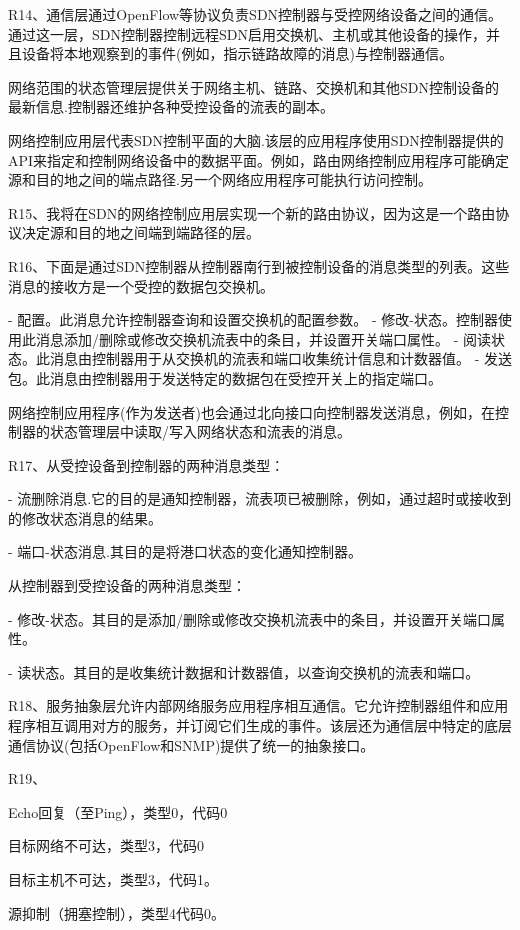 \documentclass[11pt,UTF8,twoside]{article}
\begin{document}
	R14、通信层通过OpenFlow等协议负责SDN控制器与受控网络设备之间的通信。通过这一层，SDN控制器控制远程SDN启用交换机、主机或其他设备的操作，并且设备将本地观察到的事件(例如，指示链路故障的消息)与控制器通信。
	
	网络范围的状态管理层提供关于网络主机、链路、交换机和其他SDN控制设备的最新信息.控制器还维护各种受控设备的流表的副本。
	
	网络控制应用层代表SDN控制平面的大脑.该层的应用程序使用SDN控制器提供的API来指定和控制网络设备中的数据平面。例如，路由网络控制应用程序可能确定源和目的地之间的端点路径.另一个网络应用程序可能执行访问控制。
	
	R15、我将在SDN的网络控制应用层实现一个新的路由协议，因为这是一个路由协议决定源和目的地之间端到端路径的层。
	
	R16、下面是通过SDN控制器从控制器南行到被控制设备的消息类型的列表。这些消息的接收方是一个受控的数据包交换机。
	
	- 配置。此消息允许控制器查询和设置交换机的配置参数。
	- 修改-状态。控制器使用此消息添加/删除或修改交换机流表中的条目，并设置开关端口属性。
	- 阅读状态。此消息由控制器用于从交换机的流表和端口收集统计信息和计数器值。
	- 发送包。此消息由控制器用于发送特定的数据包在受控开关上的指定端口。
	
	网络控制应用程序(作为发送者)也会通过北向接口向控制器发送消息，例如，在控制器的状态管理层中读取/写入网络状态和流表的消息。
	
	R17、从受控设备到控制器的两种消息类型：
	
	- 流删除消息.它的目的是通知控制器，流表项已被删除，例如，通过超时或接收到的修改状态消息的结果。
	
	- 端口-状态消息.其目的是将港口状态的变化通知控制器。
	
	从控制器到受控设备的两种消息类型：
	
	- 修改-状态。其目的是添加/删除或修改交换机流表中的条目，并设置开关端口属性。
	
	- 读状态。其目的是收集统计数据和计数器值，以查询交换机的流表和端口。
	
	R18、服务抽象层允许内部网络服务应用程序相互通信。它允许控制器组件和应用程序相互调用对方的服务，并订阅它们生成的事件。该层还为通信层中特定的底层通信协议(包括OpenFlow和SNMP)提供了统一的抽象接口。
	
	R19、
	
	Echo回复（至Ping），类型0，代码0
	
	目标网络不可达，类型3，代码0
	
	目标主机不可达，类型3，代码1。
	
	源抑制（拥塞控制），类型4代码0。
	
\end{document}
